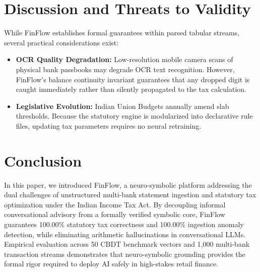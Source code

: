 \documentclass[conference]{IEEEtran}
\begin{document}
\section{Discussion and Threats to Validity}
While FinFlow establishes formal guarantees within parsed tabular streams, several practical considerations exist:
\begin{itemize}
    \item \textbf{OCR Quality Degradation:} Low-resolution mobile camera scans of physical bank passbooks may degrade OCR text recognition. However, FinFlow's balance continuity invariant guarantees that any dropped digit is caught immediately rather than silently propagated to the tax calculation.
    \item \textbf{Legislative Evolution:} Indian Union Budgets annually amend slab thresholds. Because the statutory engine is modularized into declarative rule files, updating tax parameters requires no neural retraining.
\end{itemize}

\section{Conclusion}
In this paper, we introduced FinFlow, a neuro-symbolic platform addressing the dual challenges of unstructured multi-bank statement ingestion and statutory tax optimization under the Indian Income Tax Act. By decoupling informal conversational advisory from a formally verified symbolic core, FinFlow guarantees 100.00\% statutory tax correctness and 100.00\% ingestion anomaly detection, while eliminating arithmetic hallucinations in conversational LLMs. Empirical evaluation across 50 CBDT benchmark vectors and 1,000 multi-bank transaction streams demonstrates that neuro-symbolic grounding provides the formal rigor required to deploy AI safely in high-stakes retail finance.



\end{document}
